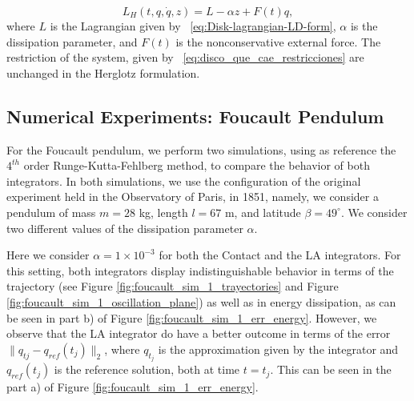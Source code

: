 \documentclass{aims}
\numberwithin{equation}{section}
\theoremstyle{definition}
\begin{document}
\begin{equation}
  L_H(t, q, \dot{q}, z) = L -\alpha z + F(t)q,
\end{equation}
where $L$ is the Lagrangian given by ~\eqref{eq:Disk-lagrangian-LD-form}, $\alpha$ is the dissipation parameter, and $F(t)$ is the nonconservative external force. The restriction of the system, given by ~\eqref{eq:disco_que_cae_restricciones} are unchanged in the Herglotz formulation.

\subsection{Numerical Experiments: Foucault Pendulum} \label{sec:numerical_experiments}
For the Foucault pendulum, we perform two simulations, using as reference the $4^{th}$ order Runge-Kutta-Fehlberg method, to compare the behavior of both integrators. In both simulations, we use the configuration of the original experiment held in the Observatory of Paris, in 1851, namely, we consider a pendulum of mass $m = 28$ kg, length $l = 67$ m, and latitude $\beta = 49^\circ$. We consider two different values of the dissipation parameter $\alpha$. 

\vskip 2mm
 Here we consider $\alpha = 1\times 10^{-3}$ for both the Contact and the LA integrators. For this setting, both integrators display indistinguishable behavior in terms of the trajectory (see Figure \ref{fig:foucault_sim_1_trayectories} and Figure \ref{fig:foucault_sim_1_oscillation_plane}) as well as in energy dissipation, as can be seen in part b) of Figure \ref{fig:foucault_sim_1_err_energy}.  However, we observe that the LA integrator do have a better outcome in terms of the error $\|q_{tj} - q_{ref}(t_j)\|_2$, where $q_{t_j}$ is the approximation given by the integrator and $q_{ref}(t_j)$ is the reference solution, both at time $t=t_j$. This can be seen in the part a) of Figure \ref{fig:foucault_sim_1_err_energy}.
\end{document}
